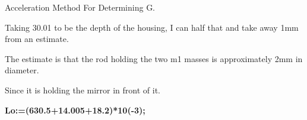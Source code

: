 \documentclass{article}
\begin{document}
\pagestyle{empty}
\begin{maplegroup}
\begin{Maple Normal}{
Acceleration Method For Determining G.}\end{Maple Normal}

\begin{Maple Normal}{
}\end{Maple Normal}
\end{maplegroup}
\begin{maplegroup}
\begin{mapleinput}
\end{mapleinput}
\end{maplegroup}
\begin{maplegroup}
\begin{Maple Normal}{
}\end{Maple Normal}
\begin{Maple Normal}{
Taking 30.01 to be the depth of the housing, I can half that and take away 1mm from an estimate.}\end{Maple Normal}

\begin{Maple Normal}{
The estimate is that the rod holding the two m1 masses is approximately 2mm in diameter.}\end{Maple Normal}

\begin{Maple Normal}{
Since it is holding the mirror in front of it.}\end{Maple Normal}

\begin{Maple Normal}{
}\end{Maple Normal}
\textbf{Lo:=(630.5+14.005+18.2)*10(-3);}\mapleresult
\begin{maplelatex}
\end{maplelatex}
\end{maplegroup}
\end{document}
